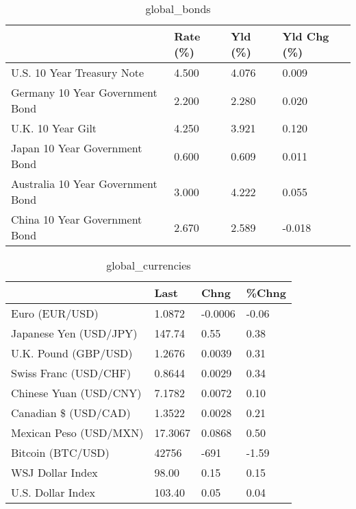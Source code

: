 \documentclass{article}%
\begin{document}
%


\begin{table}[htbp]%
\caption{global\_bonds}%
\centering%
\begin{adjustbox}{width=1\textwidth}%
\begin{tabular}{llll}
\toprule
                                  & Rate (\%) & Yld (\%) & Yld Chg (\%) \\
\midrule
       U.S. 10 Year Treasury Note &    4.500 &   4.076 &       0.009 \\
  Germany 10 Year Government Bond &    2.200 &   2.280 &       0.020 \\
                U.K. 10 Year Gilt &    4.250 &   3.921 &       0.120 \\
    Japan 10 Year Government Bond &    0.600 &   0.609 &       0.011 \\
Australia 10 Year Government Bond &    3.000 &   4.222 &       0.055 \\
    China 10 Year Government Bond &    2.670 &   2.589 &      -0.018 \\
\bottomrule
\end{tabular}
%
\end{adjustbox}%
\end{table}

%


\begin{table}[htbp]%
\caption{global\_currencies}%
\centering%
\begin{adjustbox}{width=1\textwidth}%
\begin{tabular}{llll}
\toprule
                       &    Last &    Chng & \%Chng \\
\midrule
        Euro (EUR/USD) &  1.0872 & -0.0006 & -0.06 \\
Japanese Yen (USD/JPY) &  147.74 &    0.55 &  0.38 \\
  U.K. Pound (GBP/USD) &  1.2676 &  0.0039 &  0.31 \\
 Swiss Franc (USD/CHF) &  0.8644 &  0.0029 &  0.34 \\
Chinese Yuan (USD/CNY) &  7.1782 &  0.0072 &  0.10 \\
  Canadian \$ (USD/CAD) &  1.3522 &  0.0028 &  0.21 \\
Mexican Peso (USD/MXN) & 17.3067 &  0.0868 &  0.50 \\
     Bitcoin (BTC/USD) &   42756 &    -691 & -1.59 \\
      WSJ Dollar Index &   98.00 &    0.15 &  0.15 \\
     U.S. Dollar Index &  103.40 &    0.05 &  0.04 \\
\bottomrule
\end{tabular}
%
\end{adjustbox}%
\end{table}
\end{document}
